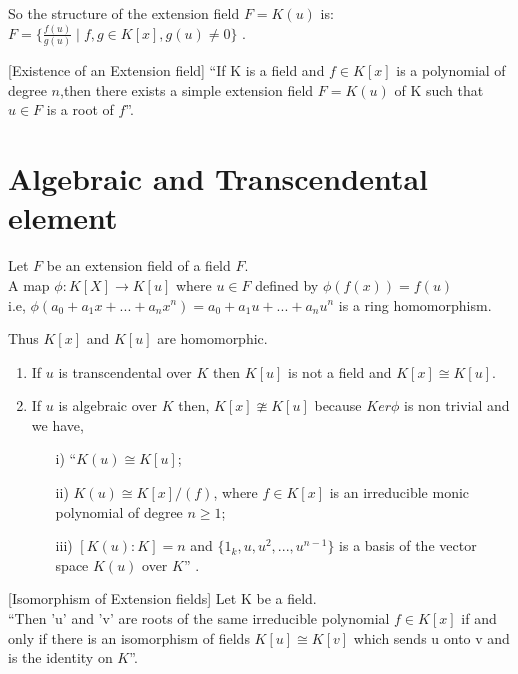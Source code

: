 So the structure of the extension field \(F=K(u)\) is:\\
\(F= \{\frac{f(u)}{g(u)} \;| \; f,g \in K[x],g(u) \neq 0\}\) \cite{hunger}.\\

\begin{theorem}\cite{hunger} [Existence of an Extension field]
``If K is a field and \(f \in K[x]\) is a polynomial of degree \(n\),then there exists a simple extension field \(F=K(u)\) of K such that \(u\in F\) is a root of \(f\)''.
\end{theorem}

\section{Algebraic and Transcendental element}
\begin{theorem} \cite{hunger}
Let \(F\) be an extension field of a field \(F\).\\
A map \(\phi:K[X] \rightarrow K[u]\) where \(u \in F\) defined by \(\phi (f(x))=f(u)\)\\
i.e, \(\phi (a_0+a_1x+...+a_nx^n)= a_0+a_1u+...+a_nu^n\) is a ring homomorphism.
\end{theorem}

Thus \( K[x]\) and \(K[u]\) are homomorphic.
  \begin{enumerate}
  \item If \(u\) is transcendental over \(K\) then \(K[u]\) is not a field and \(K[x] \cong K[u]\).
  \item If \(u\) is algebraic over \(K\) then, \(K[x] \ncong K[u]\) because \(Ker\phi\) is non trivial and we have,
    \begin{enumerate}
    \item[i)] ``\(K(u) \cong K[u]\);
    \item[ii)] \(K(u) \cong K[x]/(f)\), where \(f \in K[x]\) is an irreducible monic polynomial of degree \(n \geq 1\);
    \item[iii)] \([K(u):K]=n\) and \(\{1_k,u,u^2,...,u^{n-1}\}\) is a basis of the vector space \(K(u)\) over \(K\)'' \cite{hunger}.
    \end{enumerate}
  \end{enumerate}

\begin{theorem} \cite{hunger} [Isomorphism of Extension fields]
 Let K be a field.\\
 ``Then 'u' and 'v' are  roots of the same irreducible polynomial \(f \in K[x]\) if and only if there is an isomorphism of fields \(K[u] \cong K[v]\) which sends u onto v and is the identity on \(K\)''.
\end{theorem}



